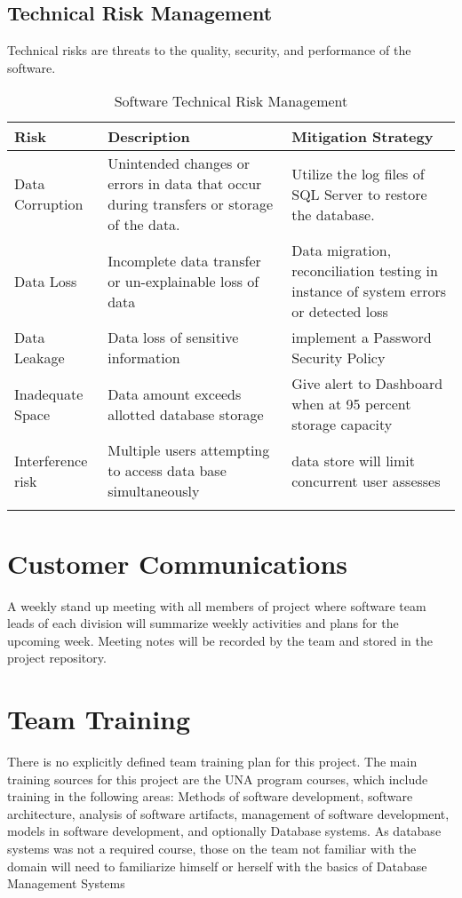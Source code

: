 \documentclass[letterpaper,12pt,oneside,listof=totoc]{scrreprt}
\begin{document}
\subsection{Technical Risk Management} 
Technical risks are threats to the quality, security, and performance of the software. 
\begin{longtable}{| p{} | p{} | p{} |} 
    \hline
    \textbf{Risk} & \textbf{Description} & \textbf{Mitigation Strategy} \\
    \hline
        Data Corruption & Unintended changes or errors in data that occur during transfers or storage of the data. & Utilize the log files of SQL Server to restore the database. \\
    \hline
    Data Loss & Incomplete data transfer or un-explainable loss of data & Data migration, reconciliation testing in instance of system errors or detected loss\\
    \hline 
    Data Leakage & Data loss of sensitive information & implement a Password Security Policy\\
    \hline
    Inadequate Space & Data amount exceeds allotted database storage & Give alert to Dashboard when at 95 percent storage capacity\\
    \hline 
    Interference risk & Multiple users attempting to access data base simultaneously & data store will limit concurrent user assesses\\
    \hline
\caption{Software Technical Risk Management}
\end{longtable}


\section{Customer Communications} %
A weekly stand up meeting with all members of project where software team leads of each division will summarize weekly activities and plans for the upcoming week. Meeting notes will be recorded by the team and stored in the project repository.
    
\newpage
\section{Team Training} %
There is no explicitly defined team training plan for this project. The main training sources for this project are the UNA program courses, which include training in the following areas: Methods of software development, software architecture, analysis of software artifacts, management of software development, models in software development, and optionally Database systems. As database systems was not a required course, those on the team not familiar with the domain will need to familiarize himself or herself with the basics of Database Management Systems
\end{document}
